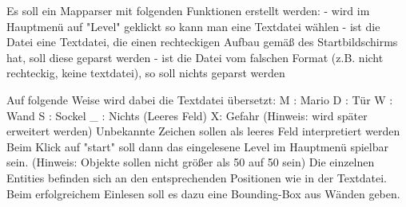  Es soll ein Mapparser mit folgenden Funktionen erstellt werden: 
	- wird im Hauptmenü auf "Level" geklickt so kann man eine Textdatei wählen
	- ist die Datei eine Textdatei, die einen rechteckigen Aufbau gemäß des Startbildschirms hat, soll diese geparst werden
	- ist die Datei vom falschen Format (z.B. nicht rechteckig, keine textdatei), so soll nichts geparst werden

Auf folgende Weise wird dabei die Textdatei übersetzt: 
M : Mario 
D : Tür 
W : Wand
S : Sockel
\_ : Nichts (Leeres Feld) 
X: Gefahr (Hinweis: wird später erweitert werden) 
Unbekannte Zeichen sollen als leeres Feld interpretiert werden
Beim Klick auf "start" soll dann das eingelesene Level im Hauptmenü spielbar sein. (Hinweis: Objekte sollen nicht größer als 50 auf 50 sein)
Die einzelnen Entities befinden sich an den entsprechenden Positionen wie in der Textdatei.
Beim erfolgreichem Einlesen soll es dazu eine Bounding-Box aus Wänden geben.
